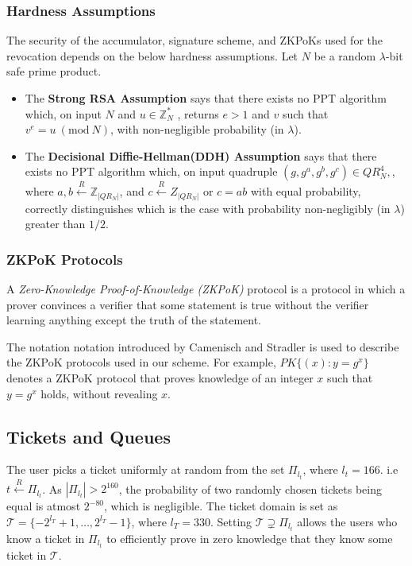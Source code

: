 \documentclass[12pt]{article}
\newcommand{\rIn}{\xleftarrow{R}}
\newcommand{\PK}[2]{\ensuremath{PK\{(#1): #2\}}}
\newcommand{\Mod}[1]{\ (\mathrm{mod}\ #1)}
\begin{document}
\subsubsection*{Hardness Assumptions}
The security of the accumulator, signature scheme, and ZKPoKs used for the revocation depends on the below hardness assumptions. Let $N$ be a random $\lambda$-bit safe prime product.
\begin{itemize}
	\item The \textbf{Strong RSA Assumption} says that there exists no PPT algorithm which, on input $N$ and $u \in \mathbb{Z}_N^* $ , returns $e > 1$ and $v$ such that $v^ e = u \Mod{N}$, with non-negligible probability (in $\lambda$).
	
	\item The \textbf{Decisional Diffie-Hellman(DDH) Assumption} says that there exists no PPT algorithm which, on input quadruple $(g, g^a, g^b, g^c) \in QR_N^4,$, where $a, b \rIn \mathbb{Z}_{|QR_N |}$, and $c \rIn Z_{|QR_N|}$ or $c = ab$ with equal probability, correctly distinguishes which is the case with probability non-negligibly (in $\lambda$) greater than $1/2$.
\end{itemize}

\subsubsection*{ZKPoK Protocols}
A \textit{Zero-Knowledge Proof-of-Knowledge (ZKPoK)} protocol is a protocol in which a prover convinces a verifier that some statement is true without the verifier learning anything except the truth of the statement.\\

\par The notation notation introduced by Camenisch and Stradler\cite*{Camenisch} is used to describe the ZKPoK protocols used in our scheme. For example, $\PK{x}{y = g^x}$ denotes a ZKPoK protocol that proves knowledge of an integer $x$ such that $y = g^x$ holds, without revealing $x$.


\subsection{Tickets and Queues}
The user picks a ticket uniformly at random from the set $\Pi_{l_t}$, where $l_t = 166$. i.e $t \rIn \Pi_{l_t}$. As $|\Pi_{l_t}| > 2^{160}$, the probability of two randomly chosen tickets being equal is atmost $2^{-80}$, which is negligible. The ticket domain is set as $ \mathcal{T} = \{ -2^{l_T}+1, \dots , 2^{l_T}-1 \}$, where $l_T = 330$. Setting $\mathcal{T} \supsetneq \Pi_{l_t}$ allows the users who know a ticket in $\Pi_{l_t}$ to efficiently prove in zero knowledge that they know some ticket in $\mathcal{T}$. \\
\end{document}
